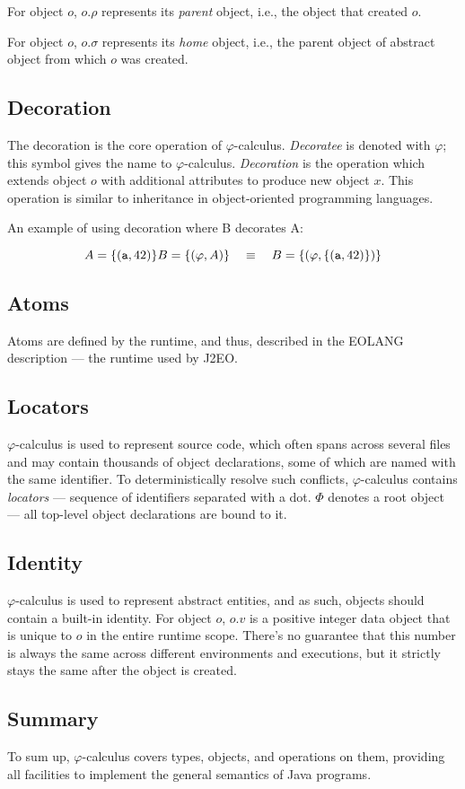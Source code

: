 For object $o$, $o.\rho$ represents its \emph{parent} object, i.e., the object that created $o$.

For object $o$, $o.\sigma$ represents its \emph{home} object, i.e., the parent object of abstract object from which $o$ was created.


\subsection{Decoration}
The decoration is the core operation of $\varphi$-calculus. \emph{Decoratee} is denoted with $\varphi$; this symbol gives the name to $\varphi$-calculus. \emph{Decoration} is the operation which extends object $o$ with additional attributes to produce new object $x$. This operation is similar to inheritance in object-oriented programming languages.

An example of using decoration where B decorates A:

\[
    A = \{ (\texttt{a}, 42) \} \\
    B = \{ (\varphi, A) \}  \quad\equiv\quad  B = \{ (\varphi, \{ (\texttt{a}, 42) \}) \} \\
\]


\subsection{Atoms}
Atoms are defined by the runtime, and thus, described in the EOLANG description --- the runtime used by J2EO.

\subsection{Locators}
$\varphi$-calculus is used to represent source code, which often spans across several files and may contain thousands of object declarations, some of which are named with the same identifier. To deterministically resolve such conflicts, $\varphi$-calculus contains \emph{locators} --- sequence of identifiers separated with a dot. $\Phi$ denotes a root object --- all top-level object declarations are bound to it.

\subsection{Identity}
$\varphi$-calculus is used to represent abstract entities, and as such, objects should contain a built-in identity. For object $o$, $o.v$ is a positive integer data object that is unique to $o$ in the entire runtime scope. There's no guarantee that this number is always the same across different environments and executions, but it strictly stays the same after the object is created.

\subsection{Summary}

To sum up, $\varphi$-calculus covers types, objects, and operations on them, providing all facilities to implement the general semantics of Java programs.
